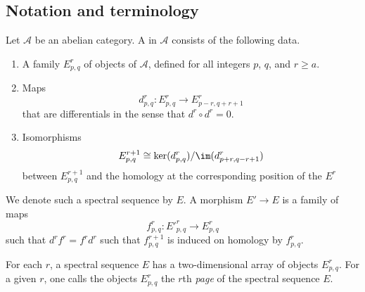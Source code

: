 \documentclass[main.tex]{subfiles}
\begin{document}
\subsection{Notation and terminology}
\label{ssc:notation_and_terminology}

\begin{definition}
  \label{def:homology_spectral_sequence}
  Let $\mathcal{A}$ be an abelian category. A  in $\mathcal{A}$ consists of the following data.
  \begin{enumerate}
    \item A family $E^{r}_{p,q}$ of objects of $\mathcal{A}$, defined for all integers $p$, $q$, and $r \geq a$.

    \item Maps
      \begin{equation*}
        d^{r}_{p,q}\colon E^{r}_{p,q} \to E^{r}_{p-r,q+r+1}
      \end{equation*}
      that are differentials in the sense that $d^{r} \circ d^{r} = 0$.

    \item Isomorphisms
      \begin{equation*}
        E^{r+1}_{p,q} \cong \ker (d^{r}_{p,q})/\im(d^{r}_{p+r,q-r+1})
      \end{equation*}
      between $E^{r+1}_{p,q}$ and the homology at the corresponding position of the $E^{r}$
  \end{enumerate}

  We denote such a spectral sequence by $E$. A morphism $E' \to E$ is a family of maps
  \begin{equation*}
    f^{r}_{p,q}\colon E'^{r}_{p,q} \to E^{r}_{p, q}
  \end{equation*}
  such that $d^{r}f^{r} = f^{r}d^{r}$ such that $f^{r+1}_{p,q}$ is induced on homology by $f^{r}_{p,q}$.
\end{definition}

For each $r$, a spectral sequence $E$ has a two-dimensional array of objects $E^{r}_{p,q}$. For a given $r$, one calls the objects $E^{r}_{p,q}$ the $r$th \emph{page} of the spectral sequence $E$.
\end{document}
